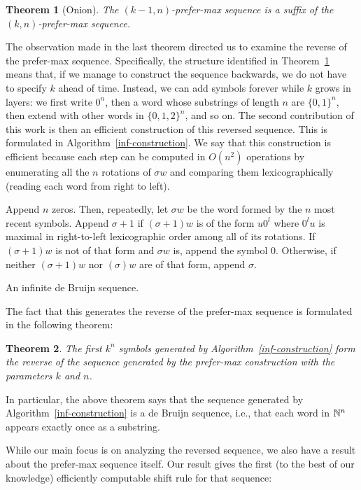 \documentclass{article} %
\newtheorem{theorem}{Theorem} \newtheorem{proposition}[theorem]{Proposition}
\theoremstyle{definition} \newtheorem{definition}[theorem]{Definition}
\begin{document}
	\begin{theorem}[Onion] The $(k-1,n)$-prefer-max sequence is a suffix of the
		$(k,n)$-prefer-max sequence. \label{thm:onion} \end{theorem}
	
	The observation made in the last theorem directed us to examine the reverse of
	the prefer-max sequence. Specifically, the structure identified in
	Theorem~\ref{thm:onion} means that, if we manage to construct the sequence
	backwards, we do not have to specify $k$ ahead of time. Instead, we can add
	symbols forever while $k$ grows in layers: we first write $0^n$, then a word
	whose substrings of length $n$ are $\{0,1\}^n$, then extend with other words in
	$\{0,1,2\}^n$, and so on. The second contribution of this work is then an
	efficient construction of this reversed sequence. This is formulated in
	Algorithm~\ref{inf-construction}. We say that this construction is efficient
	because each step can be computed in $O(n^2)$ operations by enumerating all the
	$n$ rotations of $\sigma w$ and comparing them lexicographically (reading each
	word from right to left).
	
	
	\begin{algorithm}[!h] Append $n$ zeros. Then, repeatedly, let $\sigma w$ be the
		word formed by the $n$ most recent symbols. Append $\sigma+1$ if $(\sigma+1)w$
		is of the form $u0^l$ where $0^lu$ is maximal in right-to-left lexicographic
		order among all of its rotations. If $(\sigma+1)w$ is not of that form and
		$\sigma w$ is, append the symbol $0$. Otherwise, if neither $(\sigma+1)w$ nor
		$(\sigma)w$ are of that form, append $\sigma$. \caption{An infinite de Bruijn
			sequence.} \label{inf-construction} \end{algorithm}
	
	The fact that this generates the reverse of the prefer-max sequence is
	formulated in the following theorem:
	
	\begin{theorem} The first $k^n$ symbols generated by
		Algorithm~\ref{inf-construction} form the reverse of the sequence generated by
		the prefer-max construction with the parameters $k$ and $n$. \end{theorem}
	
	In particular, the above theorem says that the sequence generated by
	Algorithm~\ref{inf-construction} is a de Bruijn sequence, i.e., that each word
	in ${\mathbb{N}}^n$ appears exactly once as a substring.
	
	While our main focus is on analyzing the reversed sequence, we also have a
	result about the prefer-max sequence itself. Our result gives the first (to the
	best of our knowledge) efficiently computable shift rule for that sequence:
	
\end{document}
